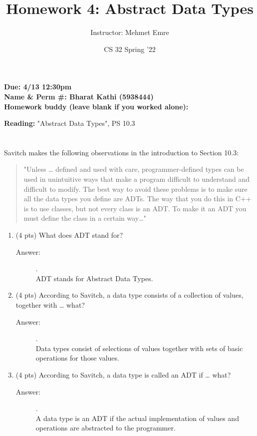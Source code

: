 \documentclass[11pt]{article}
\author{Instructor: Mehmet Emre}
\date{CS 32 Spring '22}
\title{Homework 4: Abstract Data Types}
\begin{document}
\maketitle
\textbf{Due: 4/13 12:30pm} \\ 
\vspace{1em}
\textbf{Name \& Perm \#: Bharat Kathi (5938444)} \\ 
\textbf{Homework buddy (leave blank if you worked alone):}

\vspace{1em}
\textbf{Reading:} "Abstract Data Types", PS 10.3


\section{}
\label{sec:orgf0d6776}

Savitch makes the following observations in the introduction to
Section 10.3:


\begin{quote}
"Unless \ldots{} defined and used with care, programmer-defined types can be
used in unintuitive ways that make a program difficult to understand and
difficult to modify. The best way to avoid these problems is to make
sure all the data types you define are ADTs. The way that you do this in
C++ is to use classes, but not every class is an ADT. To make it an ADT
you must define the class in a certain way\ldots{}"
\end{quote}

\begin{enumerate}
\item (4 pts) What does ADT stand for?
\begin{description}
    \item[Answer:] .\\
    ADT stands for Abstract Data Types.
\end{description}
\item (4 pts) According to Savitch, a data type consists of a collection
of values, together with \ldots{} what?
\begin{description}
    \item[Answer:] .\\
    Data types consist of selections of values together with sets of basic operations for those values.
\end{description}
\item (4 pts) According to Savitch, a data type is called an ADT if
\ldots{} what?
\begin{description}
    \item[Answer:] .\\
    A data type is an ADT if the actual implementation of values and operations are abstracted to the programmer.
\end{description}
\end{enumerate}
\end{document}
